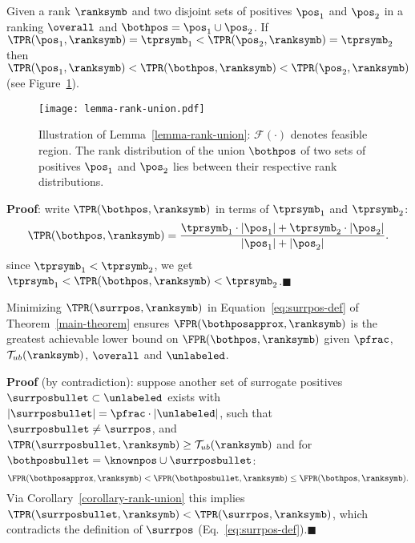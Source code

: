 \begin{lemma} \label{lemma-rank-union}
Given a rank $\ranksymb$ and two disjoint sets of positives $\pos_1$ and $\pos_2$ in a ranking $\overall$ and $\bothpos=\pos_1\cup\pos_2$. If $\TPR(\pos_1,\ranksymb) = \tprsymb_1 < \TPR(\pos_2, \ranksymb) = \tprsymb_2$ then $\TPR(\pos_1,\ranksymb) < \TPR(\bothpos,\ranksymb) < \TPR(\pos_2, \ranksymb)$ (see Figure~\ref{fig:lemma-rank-union}).

\begin{figure}[!h]
  \centering
  \texttt{[image: lemma-rank-union.pdf]}
  \caption{Illustration of Lemma~\ref*{lemma-rank-union}: $\mathcal{F}(\cdot)$ denotes feasible region. The rank distribution of the union $\bothpos$ of two sets of positives $\pos_1$ and $\pos_2$ lies between their respective rank distributions.} 
  \label{fig:lemma-rank-union}
\end{figure}

\textbf{Proof}: write $\TPR(\bothpos,\ranksymb)$ in terms of $\tprsymb_1$ and $\tprsymb_2$:
\begin{equation}
\TPR(\bothpos,\ranksymb) = \frac{\tprsymb_1 \cdot|\pos_1| + \tprsymb_2\cdot|\pos_2|}{|\pos_1|+|\pos_2|}. \label{tpr-union}
\end{equation}
since $\tprsymb_1 < \tprsymb_2$, we get $\tprsymb_1 < \TPR(\bothpos,\ranksymb) < \tprsymb_2$.\hfill$\blacksquare$
\end{lemma}


\begin{lemma} \label{lemma-glb}
Minimizing $\TPR(\surrpos, \ranksymb)$ in Equation~\eqref{eq:surrpos-def} of Theorem~\ref{main-theorem} ensures $\FPR(\bothposapprox, \ranksymb)$ is the greatest achievable lower bound on $\FPR(\bothpos, \ranksymb)$ given $\pfrac$, $\mathcal{T}_{ub}(\ranksymb)$, $\overall$ and $\unlabeled$. 

\textbf{Proof} (by contradiction): suppose another set of surrogate positives $\surrposbullet \subset \unlabeled$ exists with $|\surrposbullet|=\pfrac\cdot|\unlabeled|$, such that $\surrposbullet\neq\surrpos$, and $\TPR(\surrposbullet,\ranksymb) \geq \mathcal{T}_{ub}(\ranksymb)$ and for $\bothposbullet = \knownpos\cup\surrposbullet$: 
\begin{equation*}
\FPR(\bothposapprox,\ranksymb) < \FPR(\bothposbullet,\ranksymb) \leq \FPR(\bothpos,\ranksymb).
\end{equation*}
Via Corollary~\ref{corollary-rank-union} this implies $\TPR(\surrposbullet,\ranksymb) < \TPR(\surrpos,\ranksymb)$, which contradicts the definition of $\surrpos$ (Eq.~\eqref{eq:surrpos-def}).\hfill$\blacksquare$
\end{lemma}

